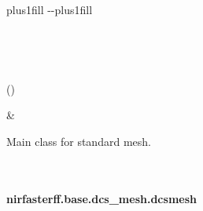 \documentclass[letterpaper,10pt,english]{sphinxmanual}
\begin{document}
\begin{savenotes}
\sphinxatlongtablestart
\sphinxthistablewithglobalstyle
\sphinxthistablewithnovlinesstyle
\makeatletter
  \LTleft \@totalleftmargin plus1fill
  \LTright\dimexpr\columnwidth-\@totalleftmargin-\linewidth\relax plus1fill
\makeatother
\begin{longtable}{}
\sphinxtoprule
\endfirsthead

\\
\sphinxtoprule
\endhead

\sphinxbottomrule
{}\\
\endfoot

\endlastfoot
\sphinxtableatstartofbodyhook
\begin{varwidth}[t]{}
\sphinxAtStartPar
{\hyperref[\detokenize{_autosummary/nirfasterff.base.dcs_mesh.dcsmesh:nirfasterff.base.dcs_mesh.dcsmesh}]{}}()
\sphinxbeforeendvarwidth
\end{varwidth}%
&\begin{varwidth}[t]{}
\sphinxAtStartPar
Main class for standard mesh.
\sphinxbeforeendvarwidth
\end{varwidth}%
\\
\sphinxbottomrule
\end{longtable}
\sphinxtableafterendhook
\sphinxatlongtableend
\end{savenotes}

\sphinxstepscope


\paragraph{nirfasterff.base.dcs\_mesh.dcsmesh}
\label{\detokenize{_autosummary/nirfasterff.base.dcs_mesh.dcsmesh:nirfasterff-base-dcs-mesh-dcsmesh}}\label{\detokenize{_autosummary/nirfasterff.base.dcs_mesh.dcsmesh::doc}}
\end{document}
